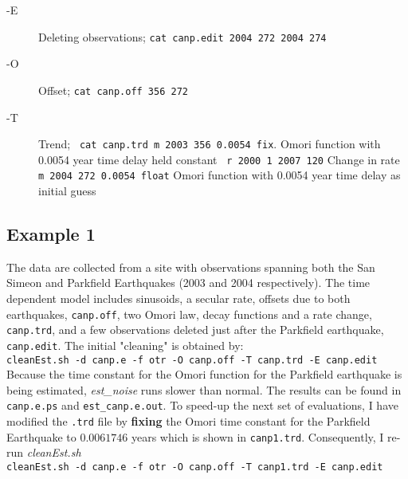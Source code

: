 \documentclass[12pt]{amsart}
\begin{document}
\begin{description}
\item[-E] Deleting observations;
\linebreak \texttt{cat canp.edit
2004 272 2004 274}
\item[-O] Offset;
\linebreak \texttt{cat canp.off
 356
 272}
\item[-T] Trend;
\texttt{
\linebreak
cat canp.trd 
\linebreak 
m 2003 356 0.0054 fix}. \scriptsize{Omori function with 0.0054 year time delay held constant}
\normalsize
\linebreak
\texttt{ r 2000 1 2007 120}  \scriptsize{Change in rate}
\normalsize
\linebreak
\texttt{m 2004 272 0.0054 float} \scriptsize{Omori function with 0.0054 year time delay as initial guess}

\end{description}

\subsection{Example 1}

The data are collected from a site with observations spanning both the San Simeon and Parkfield  Earthquakes (2003 and 2004
respectively). The time dependent model includes sinusoids, a secular rate, offsets due to both earthquakes, \texttt{canp.off},
two Omori law, decay functions and a rate change, \texttt{canp.trd}, and a few observations deleted just after the Parkfield
earthquake, \texttt{canp.edit}.  The initial "cleaning" is obtained by:
\\
\texttt{cleanEst.sh -d canp.e -f otr -O canp.off -T canp.trd -E canp.edit}
\\

Because the time constant for the Omori function for the Parkfield earthquake is being estimated, \textit{est\_noise} runs
slower than normal.  The results can be found in \texttt{canp.e.ps} and \texttt{est\_canp.e.out}.  To speed-up the
next set of evaluations, I have modified the \texttt{.trd} file by \textbf{fixing} the Omori time constant for the Parkfield
Earthquake to $0.0061746$ years which is shown in \texttt{canp1.trd}. Consequently, I re-run \textit{cleanEst.sh}
\\
\texttt{cleanEst.sh -d canp.e -f otr -O canp.off -T canp1.trd -E canp.edit}
\\
\end{document}
